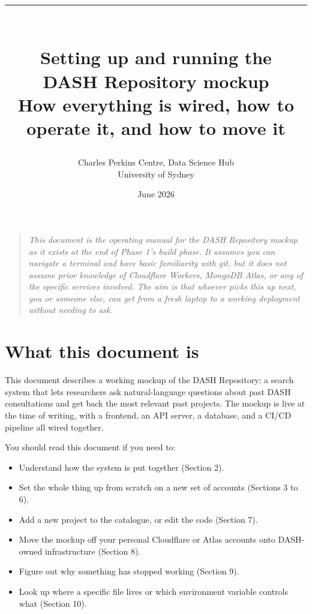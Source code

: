 \documentclass[11pt,a4paper]{article}
\title{\vspace{-2cm}\textcolor{usydred}{\rule{\textwidth}{4pt}}\\[1em]
\Huge\bfseries Setting up and running the\\DASH Repository mockup\\[0.4em]
\large\mdseries\color{mutedtext} How everything is wired, how to operate it, and how to move it}
\author{\small Charles Perkins Centre, Data Science Hub \\ \small University of Sydney}
\date{June 2026}
\begin{document}
\maketitle
\thispagestyle{empty}

\begin{quote}
\itshape\color{mutedtext}\small
This document is the operating manual for the DASH Repository mockup as it exists at the end of Phase 1's build phase. It assumes you can navigate a terminal and have basic familiarity with git, but it does not assume prior knowledge of Cloudflare Workers, MongoDB Atlas, or any of the specific services involved. The aim is that whoever picks this up next, you or someone else, can get from a fresh laptop to a working deployment without needing to ask.
\end{quote}

\vspace{1em}
\tableofcontents
\vspace{2em}

\section{What this document is}

This document describes a working mockup of the DASH Repository: a search system that lets researchers ask natural-language questions about past DASH consultations and get back the most relevant past projects. The mockup is live at the time of writing, with a frontend, an API server, a database, and a CI/CD pipeline all wired together.

You should read this document if you need to:

\begin{itemize}[leftmargin=1.5em,itemsep=2pt]
  \item Understand how the system is put together (Section 2).
  \item Set the whole thing up from scratch on a new set of accounts (Sections 3 to 6).
  \item Add a new project to the catalogue, or edit the code (Section 7).
  \item Move the mockup off your personal Cloudflare or Atlas accounts onto DASH-owned infrastructure (Section 8).
  \item Figure out why something has stopped working (Section 9).
  \item Look up where a specific file lives or which environment variable controls what (Section 10).
\end{itemize}
\end{document}
